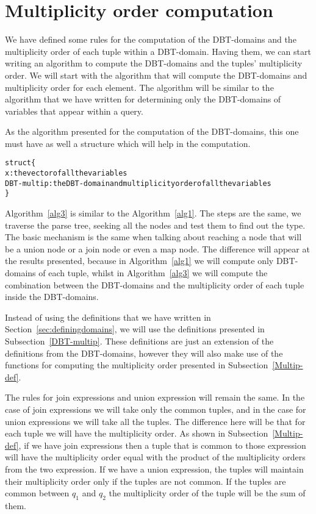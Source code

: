 \documentclass[12pt]{article}
\begin{document}
\section{Multiplicity order computation}

We have defined some rules for the computation of the DBT-domains and the multiplicity order of each tuple within a DBT-domain. Having them, we can start writing an algorithm to compute the DBT-domains and the tuples' multiplicity order. We will start with the algorithm that will compute the DBT-domains and multiplicity order for each element. The algorithm will be similar to the algorithm that we have written for determining only the DBT-domains of variables that appear within a query.

As the algorithm presented for the computation of the DBT-domains, this one must have as well a structure which will help in the computation.

\begin{program}
\begin{alltt}
struct \{
x: the vector of all the variables 
DBT-multip: the DBT-domain and multiplicity order of all the variables
\}
\end{alltt}
\caption{$nodeMultipOrderAttribute$}
\label{struct1}
\end{program}

Algorithm~\ref{alg3} is similar to the Algorithm~\ref{alg1}. The steps are the same, we traverse the parse tree, seeking all the nodes and test them to find out the type. The basic mechanism is the same when talking about reaching a node that will be a union node or a join node or even a map node. The difference will appear at the results presented, because in  Algorithm~\ref{alg1} we will compute only DBT-domains of each tuple, whilst in Algorithm~\ref{alg3} we will compute the combination between the DBT-domains and the multiplicity order of each tuple inside the DBT-domains.

Instead of using the definitions that we have written in Section~\ref{sec:definingdomains}, we will use the definitions presented in Subsection~\ref{DBT-multip}. These definitions are just an extension of the definitions from the DBT-domains, however they will also make use of the functions for computing the multiplicity order presented in Subsection~\ref{Multip-def}.

The rules for join expressions and union expression will remain the same. In the case of join expressions we will take only the common tuples, and in the case for union expressions we will take all the tuples. The difference here will be that for each tuple we will have the multiplicity order. As shown in Subsection~\ref{Multip-def}, if we have join expressions then a tuple that is common to those expression will have the multiplicity order equal with the product of the multiplicity orders from the two expression. If we have a union expression, the tuples will maintain their multiplicity order only if the tuples are not common. If the tuples are common between $q_1$ and $q_2$ the multiplicity order of the tuple will be the sum of them.
\end{document}
